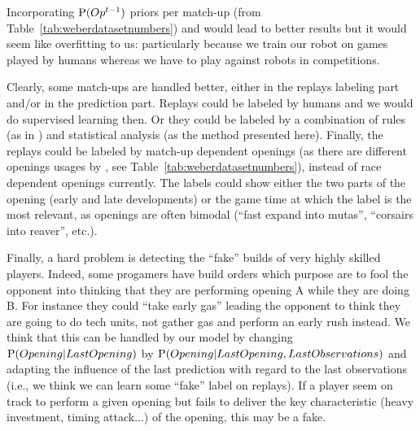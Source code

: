 Incorporating $\mathrm{P}(Op^{t-1})$ priors per match-up (from Table~\ref{tab:weberdatasetnumbers}) and  would lead to better results but it would seem like overfitting to us: particularly because we train our robot on games played by humans whereas we have to play against robots in competitions.


Clearly, some match-ups are handled better, either in the replays labeling part and/or in the prediction part. Replays could be labeled by humans and we would do supervised learning then. Or they could be labeled by a combination of rules (as in \citep{weberStrat}) and statistical analysis (as the method presented here). Finally, the replays could be labeled by match-up dependent openings (as there are different openings usages by , see Table~\ref{tab:weberdatasetnumbers}), instead of race dependent openings currently. The labels could show either the two parts of the opening (early and late developments) 
or the game time at which the label is the most relevant, as openings are often bimodal (``fast expand into mutas'', ``corsairs into reaver'', etc.).

Finally, a hard problem is detecting the ``fake'' builds of very highly skilled players. Indeed, some progamers have build orders which purpose are to fool the opponent into thinking that they are performing opening A while they are doing B. For instance they could ``take early gas'' leading the opponent to think they are going to do tech units, not gather gas 
and perform an early rush instead. We think that this can be handled by our model by changing $\mathrm{P}(Opening|LastOpening)$ by $\mathrm{P}(Opening|LastOpening, LastObservations)$ and adapting the influence of the last prediction with regard to the last observations (i.e., we think we can learn some ``fake'' label on replays). If a player seem on track to perform a given opening but fails to deliver the key characteristic (heavy investment, timing attack...) of the opening, this may be a fake.


